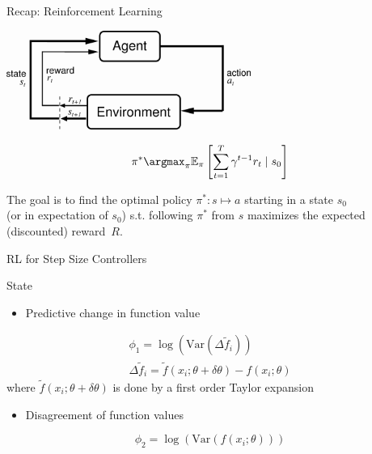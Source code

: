 \begin{frame}[c]{Recap: Reinforcement Learning }

\begin{center}
	\includegraphics[width=0.6\textwidth]{images/suttonbarto_rl.png}
\end{center}

\pause

\begin{eqnarray}
\pi^* \argmax_{\pi} \mathbb{E}_{\pi} \left[ \sum^{T}_{t=1} \gamma^{t-1} r_t \mid s_0 \right] \nonumber
\end{eqnarray}

The goal is to find the optimal policy $\pi^{*}: s \mapsto a$ starting in a state $s_0$\\ (or in expectation of $s_0$) s.t. following $\pi^{*}$ from $s$ maximizes the expected (discounted) reward~$R$.


\end{frame}
\begin{frame}[c]{RL for Step Size Controllers}

\begin{block}{State}
	\begin{itemize}
		\item Predictive change in function value
	\end{itemize}
\begin{eqnarray}
\phi_1 = \log \left( \text{Var}(\Delta \tilde{f}_i ) \right) \nonumber \\
\Delta \tilde{f}_i = \tilde{f}(x_i; \theta + \delta \theta) - f(x_i; \theta) \nonumber
\end{eqnarray}
where $\tilde{f}(x_i; \theta + \delta \theta)$ is done by a first order Taylor expansion

\begin{itemize}
	\item Disagreement of function values
\end{itemize}

$$ \phi_2 = \log \left(\text{Var}(f(x_i; \theta)) \right)$$


\end{block}


\end{frame}
